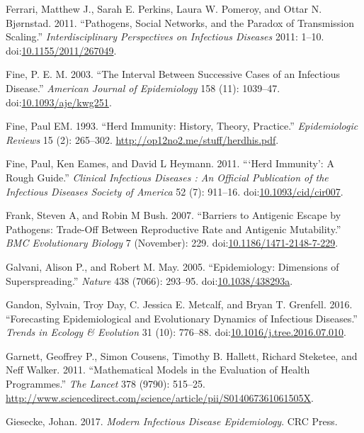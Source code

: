 \documentclass[]{book}
\theoremstyle{definition}
\theoremstyle{definition}
\theoremstyle{definition}
\theoremstyle{remark}
\begin{document}
\hypertarget{ref-ferrari11}{}
Ferrari, Matthew J., Sarah E. Perkins, Laura W. Pomeroy, and Ottar N.
Bjørnstad. 2011. ``Pathogens, Social Networks, and the Paradox of
Transmission Scaling.'' \emph{Interdisciplinary Perspectives on
Infectious Diseases} 2011: 1--10.
doi:\href{https://doi.org/10.1155/2011/267049}{10.1155/2011/267049}.

\hypertarget{ref-fine03}{}
Fine, P. E. M. 2003. ``The Interval Between Successive Cases of an
Infectious Disease.'' \emph{American Journal of Epidemiology} 158 (11):
1039--47.
doi:\href{https://doi.org/10.1093/aje/kwg251}{10.1093/aje/kwg251}.

\hypertarget{ref-fine93}{}
Fine, Paul EM. 1993. ``Herd Immunity: History, Theory, Practice.''
\emph{Epidemiologic Reviews} 15 (2): 265--302.
\url{http://op12no2.me/stuff/herdhis.pdf}.

\hypertarget{ref-fine11}{}
Fine, Paul, Ken Eames, and David L Heymann. 2011. ```Herd Immunity': A
Rough Guide.'' \emph{Clinical Infectious Diseases : An Official
Publication of the Infectious Diseases Society of America} 52 (7):
911--16.
doi:\href{https://doi.org/10.1093/cid/cir007}{10.1093/cid/cir007}.

\hypertarget{ref-frank07}{}
Frank, Steven A, and Robin M Bush. 2007. ``Barriers to Antigenic Escape
by Pathogens: Trade-Off Between Reproductive Rate and Antigenic
Mutability.'' \emph{BMC Evolutionary Biology} 7 (November): 229.
doi:\href{https://doi.org/10.1186/1471-2148-7-229}{10.1186/1471-2148-7-229}.

\hypertarget{ref-galvani05}{}
Galvani, Alison P., and Robert M. May. 2005. ``Epidemiology: Dimensions
of Superspreading.'' \emph{Nature} 438 (7066): 293--95.
doi:\href{https://doi.org/10.1038/438293a}{10.1038/438293a}.

\hypertarget{ref-gandon16}{}
Gandon, Sylvain, Troy Day, C. Jessica E. Metcalf, and Bryan T. Grenfell.
2016. ``Forecasting Epidemiological and Evolutionary Dynamics of
Infectious Diseases.'' \emph{Trends in Ecology \& Evolution} 31 (10):
776--88.
doi:\href{https://doi.org/10.1016/j.tree.2016.07.010}{10.1016/j.tree.2016.07.010}.

\hypertarget{ref-garnett11}{}
Garnett, Geoffrey P., Simon Cousens, Timothy B. Hallett, Richard
Steketee, and Neff Walker. 2011. ``Mathematical Models in the Evaluation
of Health Programmes.'' \emph{The Lancet} 378 (9790): 515--25.
\url{http://www.sciencedirect.com/science/article/pii/S014067361061505X}.

\hypertarget{ref-giesecke17}{}
Giesecke, Johan. 2017. \emph{Modern Infectious Disease Epidemiology}.
CRC Press.
\end{document}
